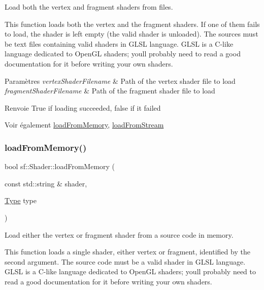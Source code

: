 Load both the vertex and fragment shaders from files. 

This function loads both the vertex and the fragment shaders. If one of them fails to load, the shader is left empty (the valid shader is unloaded). The sources must be text files containing valid shaders in G\+L\+SL language. G\+L\+SL is a C-\/like language dedicated to Open\+GL shaders; you\textquotesingle{}ll probably need to read a good documentation for it before writing your own shaders.


\begin{DoxyParams}{Paramètres}
{\em vertex\+Shader\+Filename} & Path of the vertex shader file to load \\
\hline
{\em fragment\+Shader\+Filename} & Path of the fragment shader file to load\\
\hline
\end{DoxyParams}
\begin{DoxyReturn}{Renvoie}
True if loading succeeded, false if it failed
\end{DoxyReturn}
\begin{DoxySeeAlso}{Voir également}
\hyperlink{classsf_1_1Shader_ac92d46bf71dff2d791117e4e472148aa}{load\+From\+Memory}, \hyperlink{classsf_1_1Shader_a2ee1b130c0606e4f8bcdf65c1efc2a53}{load\+From\+Stream} 
\end{DoxySeeAlso}
\mbox{\label{classsf_1_1Shader_ac92d46bf71dff2d791117e4e472148aa}} 
\subsubsection{\texorpdfstring{load\+From\+Memory()}{loadFromMemory()}\hspace{0.1cm}{\footnotesize\ttfamily [1/2]}}
{\footnotesize\ttfamily bool sf\+::\+Shader\+::load\+From\+Memory (\begin{DoxyParamCaption}\item[{const std\+::string \&}]{shader,  }\item[{\hyperlink{classsf_1_1Shader_afaa1aa65e5de37b74d047da9def9f9b3}{Type}}]{type }\end{DoxyParamCaption})}



Load either the vertex or fragment shader from a source code in memory. 

This function loads a single shader, either vertex or fragment, identified by the second argument. The source code must be a valid shader in G\+L\+SL language. G\+L\+SL is a C-\/like language dedicated to Open\+GL shaders; you\textquotesingle{}ll probably need to read a good documentation for it before writing your own shaders.


